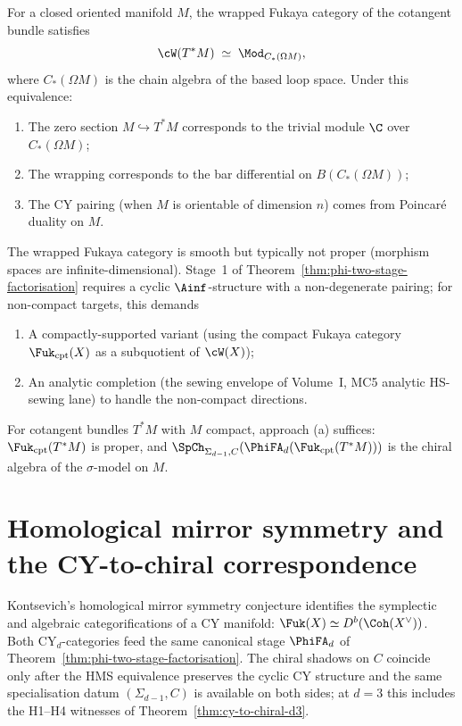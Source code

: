 \begin{theorem}
\label{thm:abouzaid-cotangent}
For a closed oriented manifold $M$, the wrapped Fukaya category of
the cotangent bundle satisfies
\[
 \cW(T^*M) \;\simeq\; \Mod_{C_*(\Omega M)},
\]
where $C_*(\Omega M)$ is the chain algebra of the based loop
space. Under this equivalence:
\begin{enumerate}[label=(\roman*)]
 \item The zero section $M \hookrightarrow T^*M$ corresponds to
 the trivial module $\C$ over $C_*(\Omega M)$;
 \item The wrapping corresponds to the bar differential on
 $B(C_*(\Omega M))$;
 \item The CY pairing (when $M$ is orientable of dimension $n$)
 comes from Poincar\'{e} duality on $M$.
\end{enumerate}
\end{theorem}

\begin{remark}
\label{rem:wrapped-cy-chiral}
The wrapped Fukaya category is smooth but typically not proper
(morphism spaces are infinite-dimensional). Stage~1 of
Theorem~\ref{thm:phi-two-stage-factorisation} requires a cyclic
$\Ainf$-structure with a non-degenerate pairing; for non-compact
targets, this demands
\begin{enumerate}[label=(\alph*)]
 \item A compactly-supported variant (using the compact Fukaya
 category $\Fuk_{\mathrm{cpt}}(X)$ as a subquotient of
 $\cW(X)$);
 \item An analytic completion (the sewing envelope of Volume~I,
 MC5 analytic HS-sewing lane) to handle the non-compact directions.
\end{enumerate}
For cotangent bundles $T^*M$ with $M$ compact, approach (a)
suffices: $\Fuk_{\mathrm{cpt}}(T^*M)$ is proper, and
$\SpCh_{\Sigma_{d-1}, C}(\PhiFA_d(\Fuk_{\mathrm{cpt}}(T^*M)))$
is the chiral algebra of the $\sigma$-model on $M$.
\end{remark}


\section{Homological mirror symmetry and the CY-to-chiral correspondence}
\label{sec:hms-chiral}

Kontsevich's homological mirror symmetry conjecture identifies the
symplectic and algebraic categorifications of a CY manifold:
$\Fuk(X) \simeq D^b(\Coh(X^\vee))$. Both CY$_d$-categories feed the
same canonical stage $\PhiFA_d$ of
Theorem~\ref{thm:phi-two-stage-factorisation}. The chiral shadows on
$C$ coincide only after the HMS equivalence preserves the cyclic CY
structure and the same specialisation datum $(\Sigma_{d-1}, C)$ is
available on both sides; at $d = 3$ this includes the
H1--H4 witnesses of Theorem~\ref{thm:cy-to-chiral-d3}.

